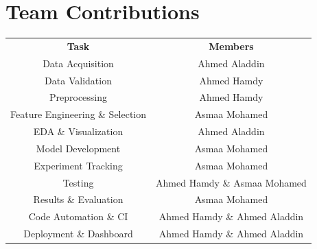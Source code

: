 \documentclass[12pt, a4paper]{article}
\begin{document}
\section{Team Contributions}
\begin{center}
\renewcommand{\arraystretch}{1.6}
\begin{tabular}{c  c}
  \rowcolor{teal}
  {\color{white}\small\bfseries Task} &
  {\color{white}\small\bfseries Members} \\
  \rowcolor{lightgray}
  Data Acquisition & Ahmed Aladdin  \\
  \rowcolor{white}
  Data Validation & Ahmed Hamdy \\
  \rowcolor{lightgray}
  Preprocessing & Ahmed Hamdy \\
  \rowcolor{white}
  Feature Engineering \& Selection & Asmaa Mohamed \\
  \rowcolor{lightgray}
  EDA \& Visualization & Ahmed Aladdin  \\
  \rowcolor{white}
  Model Development & Asmaa Mohamed \\
  \rowcolor{lightgray}
  Experiment Tracking & Asmaa Mohamed \\
  \rowcolor{white}
  Testing & Ahmed Hamdy \& Asmaa Mohamed \\
  \rowcolor{lightgray}
  Results \& Evaluation & Asmaa Mohamed \\
  \rowcolor{white}
  Code Automation \& CI & Ahmed Hamdy \& Ahmed Aladdin \\
  \rowcolor{lightgray}
  Deployment \& Dashboard & Ahmed Hamdy \& Ahmed Aladdin \\
\end{tabular}
\end{center}
\end{document}
